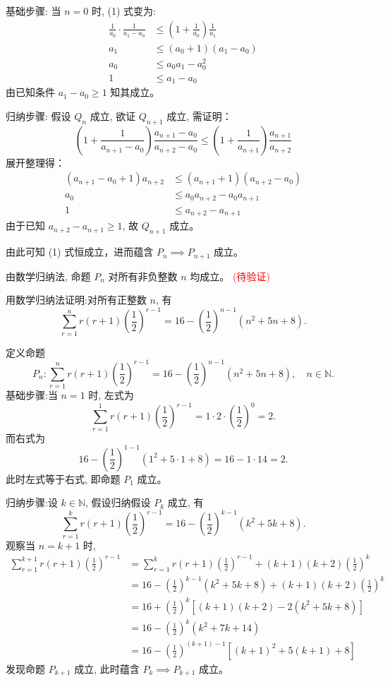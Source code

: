 \begin{questions}
\begin{solution}
基础步骤: 当 $n=0$ 时, (1) 式变为:
\begin{align}
\frac{1}{a_0} \cdot \frac{1}{a_1 - a_0} &\le \left(1 + \frac{1}{a_0}\right) \frac{1}{a_1} \\
a_1 &\le (a_0 + 1)(a_1 - a_0) \\
a_0 &\le a_0 a_1 - a_0^2 \\
1 &\le a_1 - a_0
\end{align}
由已知条件 $a_1 - a_0 \ge 1$ 知其成立。

归纳步骤: 假设 $Q_n$ 成立, 欲证 $Q_{n+1}$ 成立, 需证明：
\[
\left(1 + \frac{1}{a_{n+1} - a_0}\right) \frac{a_{n+1} - a_0}{a_{n+2} - a_0} \le \left(1 + \frac{1}{a_{n+1}}\right) \frac{a_{n+1}}{a_{n+2}}
\]
展开整理得：
\begin{align}
(a_{n+1} - a_0 + 1) a_{n+2} &\le (a_{n+1} + 1)(a_{n+2} - a_0) \\
a_0 &\le a_0 a_{n+2} - a_0 a_{n+1} \\
1 &\le a_{n+2} - a_{n+1}
\end{align}
由于已知 $a_{n+2} - a_{n+1} \ge 1$, 故 $Q_{n+1}$ 成立。

由此可知 (1) 式恒成立，进而蕴含 $P_n \implies P_{n+1}$ 成立。

由数学归纳法, 命题 $P_n$ 对所有非负整数 $n$ 均成立。
\textcolor{red}{(待验证)}
\end{solution}

    \question 用数学归纳法证明:对所有正整数 $n$, 有
    \[
    \sum_{r=1}^{n} r(r+1)\left(\frac{1}{2}\right)^{r-1} = 16 - \left(\frac{1}{2}\right)^{n-1}(n^2+5n+8).
    \]
    \begin{solution}
        定义命题
        \[
        P_n:\sum_{r=1}^{n} r(r+1)\left(\frac{1}{2}\right)^{r-1} = 16 - \left(\frac{1}{2}\right)^{n-1}(n^2+5n+8), \quad n \in \mathbb{N}.
        \]
        基础步骤:当 $n=1$ 时, 左式为
        \[
        \sum_{r=1}^{1} r(r+1)\left(\frac{1}{2}\right)^{r-1} = 1 \cdot 2 \cdot \left(\frac{1}{2}\right)^0 = 2.
        \]
        而右式为
        \[
        16 - \left(\frac{1}{2}\right)^{1-1}(1^2 + 5 \cdot 1 + 8) = 16 - 1 \cdot 14 = 2.
        \]
        此时左式等于右式, 即命题 $P_1$ 成立。

        归纳步骤:设 $k \in \mathbb{N}$, 假设归纳假设 $P_k$ 成立, 有
        \[
        \sum_{r=1}^{k} r(r+1)\left(\frac{1}{2}\right)^{r-1} = 16 - \left(\frac{1}{2}\right)^{k-1}(k^2+5k+8).
        \]
        观察当 $n=k+1$ 时,
        \begin{align}
        \sum_{r=1}^{k+1} r(r+1)\left(\frac{1}{2}\right)^{r-1} &= \sum_{r=1}^{k} r(r+1)\left(\frac{1}{2}\right)^{r-1} + (k+1)(k+2)\left(\frac{1}{2}\right)^k \\
        &= 16 - \left(\frac{1}{2}\right)^{k-1}(k^2+5k+8) + (k+1)(k+2)\left(\frac{1}{2}\right)^k \\
        &= 16 + \left(\frac{1}{2}\right)^k \left[ (k+1)(k+2) - 2(k^2+5k+8) \right] \\
        &= 16 - \left(\frac{1}{2}\right)^k (k^2+7k+14) \\
        &= 16 - \left(\frac{1}{2}\right)^{(k+1)-1} \left[ (k+1)^2 + 5(k+1) + 8 \right]
        \end{align}
        发现命题 $P_{k+1}$ 成立, 此时蕴含 $P_k \implies P_{k+1}$ 成立。


\end{solution}
\end{questions}
